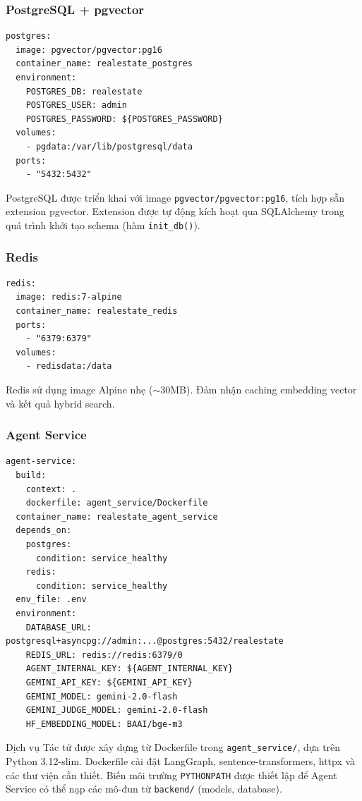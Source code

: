 \subsubsection{PostgreSQL + pgvector}

\begin{verbatim}
postgres:
  image: pgvector/pgvector:pg16
  container_name: realestate_postgres
  environment:
    POSTGRES_DB: realestate
    POSTGRES_USER: admin
    POSTGRES_PASSWORD: ${POSTGRES_PASSWORD}
  volumes:
    - pgdata:/var/lib/postgresql/data
  ports:
    - "5432:5432"
\end{verbatim}

PostgreSQL được triển khai với image \texttt{pgvector/pgvector:pg16}, tích hợp sẵn extension pgvector. Extension được tự động kích hoạt qua SQLAlchemy trong quá trình khởi tạo schema (hàm \texttt{init\_db()}).

\subsubsection{Redis}

\begin{verbatim}
redis:
  image: redis:7-alpine
  container_name: realestate_redis
  ports:
    - "6379:6379"
  volumes:
    - redisdata:/data
\end{verbatim}

Redis sử dụng image Alpine nhẹ ($\sim$30MB). Đảm nhận caching embedding vector và kết quả hybrid search.

\subsubsection{Agent Service}

\begin{verbatim}
agent-service:
  build:
    context: .
    dockerfile: agent_service/Dockerfile
  container_name: realestate_agent_service
  depends_on:
    postgres:
      condition: service_healthy
    redis:
      condition: service_healthy
  env_file: .env
  environment:
    DATABASE_URL: postgresql+asyncpg://admin:...@postgres:5432/realestate
    REDIS_URL: redis://redis:6379/0
    AGENT_INTERNAL_KEY: ${AGENT_INTERNAL_KEY}
    GEMINI_API_KEY: ${GEMINI_API_KEY}
    GEMINI_MODEL: gemini-2.0-flash
    GEMINI_JUDGE_MODEL: gemini-2.0-flash
    HF_EMBEDDING_MODEL: BAAI/bge-m3
\end{verbatim}

Dịch vụ Tác tử được xây dựng từ Dockerfile trong \texttt{agent\_service/}, dựa trên Python 3.12-slim. Dockerfile cài đặt LangGraph, sentence-transformers, httpx và các thư viện cần thiết. Biến môi trường \texttt{PYTHONPATH} được thiết lập để Agent Service có thể nạp các mô-đun từ \texttt{backend/} (models, database).

